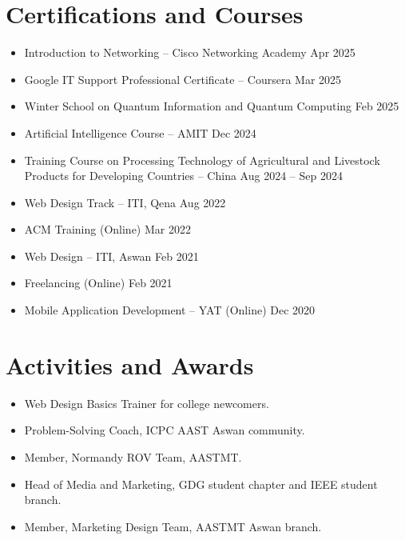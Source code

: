 \documentclass[letterpaper,11pt]{article}
\begin{document}
\section{Certifications and Courses}
\begin{itemize}
  \item Introduction to Networking -- Cisco Networking Academy \hfill Apr 2025
  \item Google IT Support Professional Certificate -- Coursera \hfill Mar 2025
  \item Winter School on Quantum Information and Quantum Computing \hfill Feb 2025
  \item Artificial Intelligence Course -- AMIT \hfill Dec 2024
  \item Training Course on Processing Technology of Agricultural and Livestock
        Products for Developing Countries -- China \hfill Aug 2024 -- Sep 2024
  \item Web Design Track -- ITI, Qena \hfill Aug 2022
  \item ACM Training (Online) \hfill Mar 2022
  \item Web Design -- ITI, Aswan \hfill Feb 2021
  \item Freelancing (Online) \hfill Feb 2021
  \item Mobile Application Development -- YAT (Online) \hfill Dec 2020
\end{itemize}

\section{Activities and Awards}
\begin{itemize}
  \item Web Design Basics Trainer for college newcomers.
  \item Problem-Solving Coach, ICPC AAST Aswan community.
  \item Member, Normandy ROV Team, AASTMT.
  \item Head of Media and Marketing, GDG student chapter and IEEE student branch.
  \item Member, Marketing Design Team, AASTMT Aswan branch.
\end{itemize}
\end{document}
